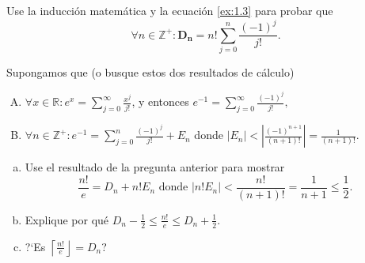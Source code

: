 \begin{solution}

\end{solution}

\begin{exercise}
Use la inducción matemática y la ecuación \eqref{ex:1.3} para probar que \[ \forall n\in\mathds{Z}^{+}\colon\bm{D_n}=n!\sum_{j=0}^n\frac{(-1)^j}{j!}. \]
\end{exercise}

\begin{solution}
	
\end{solution}

\begin{exercise}
Supongamos que (o busque estos dos resultados de cálculo)
\begin{enumerate}[A.]
	\item $\forall x\in\mathds{R}\colon e^x=\sum_{j=0}^\infty\frac{x^j}{j!}$, y entonces $e^{-1}=\sum_{j=0}^\infty\frac{(-1)^j}{j!},$
	\item $\forall n\in\mathds{Z}^{+}\colon e^{-1}=\sum_{j=0}^n\frac{(-1)^j}{j!}+E_n$ donde $|E_n|<\left|\frac{(-1)^{n+1}}{(n+1)!}\right|=\frac{1}{(n+1)!}$.
\end{enumerate}

\begin{enumerate}[(a)]
	\item Use el resultado de la pregunta anterior para mostrar \[ \frac{n!}{e}=D_{n}+n!E_{n}\text{ donde }|n!E_n|<\frac{n!}{(n+1)!}=\frac{1}{n+1}\leq\frac{1}{2}. \]
	\item Explique por qué $D_{n}-\frac{1}{2}\leq\frac{n!}{e}\leq D_{n}+\frac{1}{2}$.
	\item ?`Es $\left\lceil\frac{n!}{e}\right\rfloor=D_{n}$?
\end{enumerate}

\end{exercise}

\begin{solution}
	
\end{solution}

